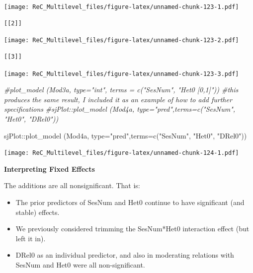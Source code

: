\documentclass[
  11pt,
]{book}
\newenvironment{Shaded}{\begin{snugshade}}{\end{snugshade}}
\newcommand{\AttributeTok}[1]{\textcolor[rgb]{0.77,0.63,0.00}{#1}}
\newcommand{\CommentTok}[1]{\textcolor[rgb]{0.56,0.35,0.01}{\textit{#1}}}
\newcommand{\FunctionTok}[1]{\textcolor[rgb]{0.00,0.00,0.00}{#1}}
\newcommand{\NormalTok}[1]{#1}
\newcommand{\SpecialCharTok}[1]{\textcolor[rgb]{0.00,0.00,0.00}{#1}}
\newcommand{\StringTok}[1]{\textcolor[rgb]{0.31,0.60,0.02}{#1}}
\providecommand{\tightlist}{%
  \setlength{\itemsep}{0pt}\setlength{\parskip}{0pt}}
\begin{document}
\texttt{[image: ReC\_Multilevel\_files/figure-latex/unnamed-chunk-123-1.pdf]}

\begin{verbatim}
[[2]]
\end{verbatim}

\texttt{[image: ReC\_Multilevel\_files/figure-latex/unnamed-chunk-123-2.pdf]}

\begin{verbatim}
[[3]]
\end{verbatim}

\texttt{[image: ReC\_Multilevel\_files/figure-latex/unnamed-chunk-123-3.pdf]}

\begin{Shaded}
\begin{Highlighting}[]
\CommentTok{\#plot\_model (Mod3a, type="int", terms = c("SesNum", "Het0 [0,1]")) \#this produces the same result, I included it as an example of how to add further specifications}
\CommentTok{\#sjPlot::plot\_model (Mod4a, type="pred",terms=c("SesNum", "Het0", "DRel0"))}
\end{Highlighting}
\end{Shaded}

\begin{Shaded}
\begin{Highlighting}[]
\NormalTok{sjPlot}\SpecialCharTok{::}\FunctionTok{plot\_model}\NormalTok{ (Mod4a, }\AttributeTok{type=}\StringTok{"pred"}\NormalTok{,}\AttributeTok{terms=}\FunctionTok{c}\NormalTok{(}\StringTok{"SesNum"}\NormalTok{, }\StringTok{"Het0"}\NormalTok{, }\StringTok{"DRel0"}\NormalTok{))}
\end{Highlighting}
\end{Shaded}

\texttt{[image: ReC\_Multilevel\_files/figure-latex/unnamed-chunk-124-1.pdf]}

\textbf{Interpreting Fixed Effects}

The additions are all nonsignificant. That is:

\begin{itemize}
\tightlist
\item
  The prior predictors of SesNum and Het0 continue to have significant (and stable) effects.
\item
  We previously considered trimming the SesNum*Het0 interaction effect (but left it in).
\item
  DRel0 as an individual predictor, and also in moderating relations with SesNum and Het0 were all non-significant.
\end{itemize}
\end{document}
